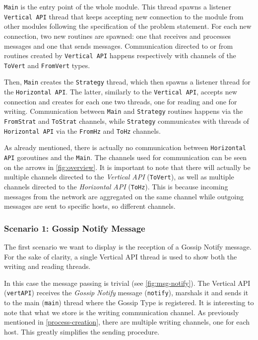 \documentclass[a4paper,english,10pt,NET]{tumarticle}
\begin{document}
\texttt{Main} is the entry point of the whole module. This thread spawns a listener \texttt{Vertical API} thread that keeps accepting new connection to the module from other modules following the specification of the problem statement. For each new connection, two new routines are spawned: one that receives and processes messages and one that sends messages. Communication directed to or from routines created by \texttt{Vertical API} happens respectively with channels of the \texttt{ToVert} and \texttt{FromVert} types.

Then, \texttt{Main} creates the \texttt{Strategy} thread, which then spawns a listener thread for the \texttt{Horizontal API}. The latter, similarly to the \texttt{Vertical API}, accepts new connection and creates for each one two threads, one for reading and one for writing. Communication between \texttt{Main} and \texttt{Strategy} routines happens via the \texttt{FromStrat} and \texttt{ToStrat} channels, while \texttt{Strategy} communicates with threads of \texttt{Horizontal API} via the \texttt{FromHz} and \texttt{ToHz} channels.

As already mentioned, there is actually no communication between \texttt{Horizontal API} goroutines and the \texttt{Main}. The channels used for communication can be seen on the arrows in \cref{fig:overview}. It is important to note that there will actually be multiple channels directed to the \textit{Vertical API} (\texttt{ToVert}), as well as multiple channels directed to the \textit{Horizontal API} (\texttt{ToHz}). This is because incoming messages from the network are aggregated on the same channel while outgoing messages are sent to specific hosts, so different channels.


\subsubsection{Scenario 1: Gossip Notify Message}

The first scenario we want to display is the reception of a Gossip Notify message. For the sake of clarity, a single Vertical API thread is used to show both the writing and reading threads.

In this case the message passing is trivial (see \cref{fig:msg-notify}). The Vertical API (\texttt{vertAPI}) receives the \textit{Gossip Notify} message (\texttt{notify}), marshals it and sends it to the main (\texttt{main}) thread where the Gossip Type is registered. It is interesting to note that what we store is the writing communication channel. As previously mentioned in \cref{process-creation}, there are multiple writing channels, one for each host. This greatly simplifies the sending procedure.
\end{document}
